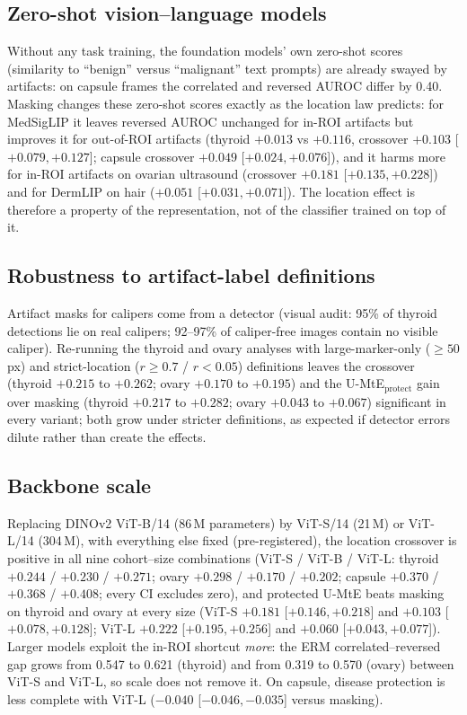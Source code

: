 \subsection{Zero-shot vision--language models}
Without any task training, the foundation models' own zero-shot scores (similarity to ``benign'' versus ``malignant''
text prompts) are already swayed by artifacts: on capsule frames the correlated and reversed AUROC differ by 0.40.
Masking changes these zero-shot scores exactly as the location law predicts: for MedSigLIP it leaves reversed AUROC
unchanged for in-ROI artifacts but improves it for out-of-ROI artifacts (thyroid $+0.013$ vs $+0.116$, crossover
$+0.103$ [$+0.079, +0.127$]; capsule crossover $+0.049$ [$+0.024, +0.076$]), and it harms more for in-ROI artifacts
on ovarian ultrasound (crossover $+0.181$ [$+0.135, +0.228$]) and for DermLIP on hair ($+0.051$ [$+0.031, +0.071$]).
The location effect is therefore a property of the representation, not of the classifier trained on top of it.

\subsection{Robustness to artifact-label definitions}
Artifact masks for calipers come from a detector (visual audit: 95\% of thyroid detections lie on real calipers;
92--97\% of caliper-free images contain no visible caliper). Re-running the thyroid and ovary analyses with
large-marker-only ($\ge 50$ px) and strict-location ($r\ge0.7$ / $r<0.05$) definitions leaves the crossover
(thyroid $+0.215$ to $+0.262$; ovary $+0.170$ to $+0.195$) and the U-MtE$_{\text{protect}}$ gain over masking
(thyroid $+0.217$ to $+0.282$; ovary $+0.043$ to $+0.067$) significant in every variant; both grow under stricter
definitions, as expected if detector errors dilute rather than create the effects.

\subsection{Backbone scale}\label{sec:scale}
Replacing DINOv2 ViT-B/14 (86\,M parameters) by ViT-S/14 (21\,M) or ViT-L/14 (304\,M), with everything else fixed
(pre-registered), the location crossover is positive in all nine cohort--size combinations (ViT-S / ViT-B / ViT-L:
thyroid $+0.244$ / $+0.230$ / $+0.271$; ovary $+0.298$ / $+0.170$ / $+0.202$; capsule $+0.370$ / $+0.368$ /
$+0.408$; every CI excludes zero), and protected U-MtE beats masking on thyroid and ovary at every size (ViT-S
$+0.181$ [$+0.146, +0.218$] and $+0.103$ [$+0.078, +0.128$]; ViT-L $+0.222$ [$+0.195, +0.256$] and $+0.060$
[$+0.043, +0.077$]). Larger models exploit the in-ROI shortcut \emph{more}: the ERM correlated--reversed gap grows
from 0.547 to 0.621 (thyroid) and from 0.319 to 0.570 (ovary) between ViT-S and ViT-L, so scale does not remove it.
On capsule, disease protection is less complete with ViT-L ($-0.040$ [$-0.046, -0.035$] versus masking).

